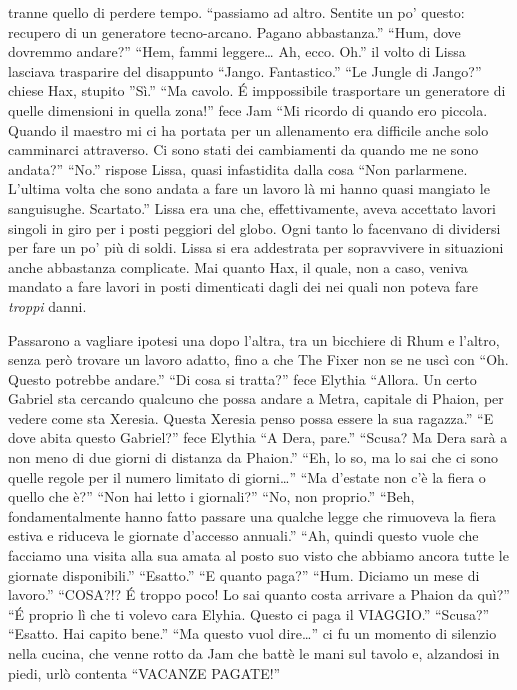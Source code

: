     tranne quello di perdere tempo. ``passiamo ad altro. Sentite un po'
    questo: recupero di un generatore tecno-arcano. Pagano abbastanza.''
    ``Hum, dove dovremmo andare?'' ``Hem, fammi leggere\dots{} Ah, ecco.
    Oh.'' il volto di Lissa lasciava trasparire del disappunto ``Jango.
    Fantastico.'' ``Le Jungle di Jango?'' chiese Hax, stupito ''Sì.'' ``Ma
    cavolo. \'E imppossibile trasportare un generatore di quelle dimensioni
    in quella zona!'' fece Jam ``Mi ricordo di quando ero piccola. Quando
    il maestro mi ci ha portata per un allenamento era difficile anche solo
    camminarci attraverso. Ci sono stati dei cambiamenti da quando me ne
    sono andata?'' ``No.'' rispose Lissa, quasi infastidita dalla cosa
    ``Non parlarmene. L'ultima volta che sono andata a fare un lavoro là mi
    hanno quasi mangiato le sanguisughe. Scartato.'' Lissa era una che,
    effettivamente, aveva accettato lavori singoli in giro per i posti
    peggiori del globo. Ogni tanto lo facenvano di dividersi per fare un
    po' più di soldi. Lissa si era addestrata per sopravvivere in
    situazioni anche abbastanza complicate. Mai quanto Hax, il quale, non a
    caso, veniva mandato a fare lavori in posti dimenticati dagli dei nei
    quali non poteva fare \emph{troppi} danni.

    Passarono a vagliare ipotesi una dopo l'altra, tra un bicchiere di Rhum
    e l'altro, senza però trovare un lavoro adatto, fino a che The Fixer
    non se ne uscì con ``Oh. Questo potrebbe andare.'' ``Di cosa si
    tratta?'' fece Elythia  ``Allora. Un certo Gabriel sta  cercando
    qualcuno che possa andare a Metra, capitale di Phaion, per vedere come
    sta Xeresia. Questa Xeresia penso possa essere la sua ragazza.'' ``E
    dove abita questo Gabriel?'' fece Elythia ``A Dera, pare.'' ``Scusa? Ma
    Dera sarà a non meno di due giorni di distanza da Phaion.'' ``Eh, lo
    so, ma lo sai che ci sono quelle regole per il numero limitato di
    giorni\dots{}'' ``Ma d'estate non c'è la fiera o quello che è?'' ``Non
    hai letto i giornali?'' ``No, non proprio.'' ``Beh, fondamentalmente
    hanno fatto passare una qualche legge che rimuoveva la fiera estiva e
    riduceva le giornate d'accesso annuali.'' ``Ah, quindi questo vuole che
    facciamo una visita alla sua amata al posto suo visto che abbiamo
    ancora tutte le giornate disponibili.'' ``Esatto.'' ``E quanto paga?''
    ``Hum. Diciamo un mese di lavoro.'' ``COSA?!? \'E troppo poco! Lo sai
    quanto costa arrivare a Phaion da quì?'' ``\'E proprio lì che ti volevo
    cara Elyhia. Questo ci paga il VIAGGIO.'' ``Scusa?'' ``Esatto. Hai
    capito bene.'' ``Ma questo vuol dire\dots{}'' ci fu un momento di
    silenzio nella cucina, che venne rotto da Jam che battè le mani sul
    tavolo e, alzandosi in piedi, urlò contenta ``VACANZE PAGATE!''

